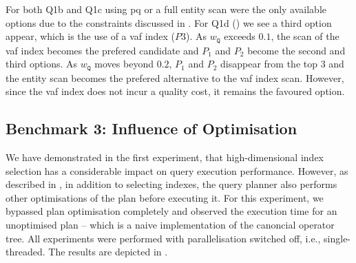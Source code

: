 For both Q1b and Q1c using \acrshort{pq} or a full entity scan were the only available options due to the constraints discussed in . For Q1d () we see a third option appear, which is the use of a \acrshort{vaf} index ($P3$). As $w_{\mathtt{Q}}$ exceeds $0.1$, the scan of the \acrshort{vaf} index becomes the prefered candidate and $P_1$ and $P_2$ become the second and third options. As $w_{\mathtt{Q}}$ moves beyond $0.2$, $P_1$ and $P_2$ disappear from the top 3 and the entity scan becomes the prefered alternative to the \acrshort{vaf} index scan. However, since the \acrshort{vaf} index does not incur a quality cost, it remains the favoured option.

\newpage

\subsection{Benchmark 3: Influence of Optimisation}
We have demonstrated in the first experiment, that high-dimensional index selection has a considerable impact on query execution performance. However, as described in , in addition to selecting indexes, the query planner also performs other optimisations of the plan before executing it. For this experiment, we bypassed plan optimisation completely and observed the execution time for an unoptimised plan -- which is a naive implementation of the canoncial operator tree. All experiments were performed with parallelisation switched off, i.e., single-threaded. The results are depicted in .

